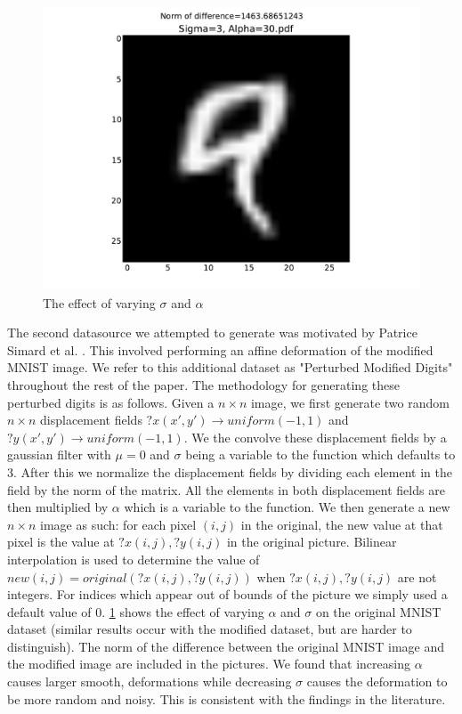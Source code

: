 \documentclass[conference]{IEEEtran}
\begin{document}
\begin{figure}[Extra Data]
	\includegraphics[scale=0.30]{Sigma=3,Alpha=30.pdf}
	\caption{The effect of varying $\sigma$ and $\alpha$}
	\label{Perturbed}
\end{figure}

The second datasource we attempted to generate was motivated by Patrice Simard et al. \cite{Simard}. This involved performing an affine deformation of the modified MNIST image. We refer to this additional dataset as "Perturbed Modified Digits" throughout the rest of the paper. The methodology for generating these perturbed digits is as follows. Given a $n\times n$ image, we first generate two random $n\times n$ displacement fields $?x(x',y')\rightarrow uniform(-1,1)$ and $?y(x',y')\rightarrow uniform(-1,1)$. We the convolve these displacement fields by a gaussian filter with $\mu = 0$ and $\sigma$ being a variable to the function which defaults to 3. After this we normalize the displacement fields by dividing each element in the field by the norm of the matrix. All the elements in both displacement fields are then multiplied by $\alpha$ which is a variable to the function. We then generate a new $n\times n$ image as such: for each pixel $(i,j)$ in the original, the new value at that pixel is the value at $?x(i,j),?y(i,j)$ in the original picture. Bilinear interpolation is used to determine the value of $new(i,j)=original(?x(i,j),?y(i,j))$ when $?x(i,j),?y(i,j)$ are not integers. For indices which appear out of bounds of the picture we simply used a default value of 0. \ref{Perturbed} shows the effect of varying $\alpha$ and $\sigma$ on the original MNIST dataset (similar results occur with the modified dataset, but are harder to distinguish). The norm of the difference between the original MNIST image and the modified image are included in the pictures. We found that increasing $\alpha$ causes larger smooth, deformations while decreasing $\sigma$ causes the deformation to be more random and noisy. This is consistent with the findings in the literature.
\end{document}
